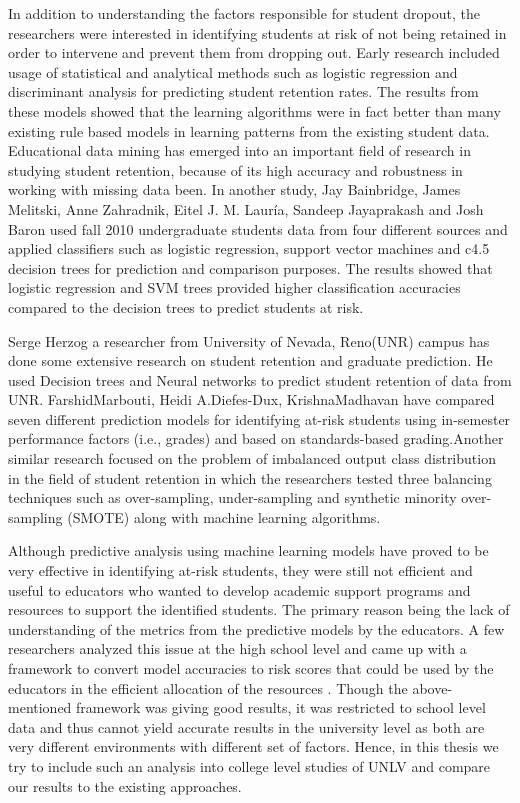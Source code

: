 \documentclass[11pt,openright]{report}
\begin{document}
In addition to understanding the factors responsible for student dropout, the researchers were interested in identifying students at risk of not being retained in order to intervene and prevent them from dropping out. Early research included usage of statistical and analytical methods such as logistic regression and discriminant analysis for predicting student retention rates\cite{lakkaraju2015machine,marbouti2016models,adejo2017}. The results from these models showed that the learning algorithms were in fact better than many existing rule based models in learning patterns from the existing student data. Educational data mining has emerged into an important field of research in studying student retention, because of its high accuracy and robustness in working with missing data been\cite{alkhasawneh2014developing}. In another study, Jay Bainbridge, James Melitski, Anne Zahradnik, Eitel J. M. Lauría, Sandeep Jayaprakash and Josh Baron used fall 2010 undergraduate students data from four different sources and applied classifiers such as logistic regression, support vector machines and c4.5 decision trees for prediction and comparison purposes\cite{bainbridge2015}. The results showed that logistic regression and SVM trees provided higher classification accuracies compared to the decision trees to predict students at risk. 

Serge Herzog a researcher from University of Nevada, Reno(UNR) campus has done some extensive research on student retention and graduate prediction. He used Decision trees and Neural networks to predict student retention of data from UNR\cite{herzog2006estimating}. FarshidMarbouti, Heidi A.Diefes-Dux, KrishnaMadhavan \cite{marbouti2016models} have compared seven different prediction models for identifying at-risk students using in-semester performance factors (i.e., grades) and based on standards-based grading.Another similar research focused on the problem of imbalanced output class distribution in the field of student retention in which the researchers tested three balancing techniques such as over-sampling, under-sampling and synthetic minority over-sampling (SMOTE) along with machine learning algorithms.

Although predictive analysis using machine learning models have proved to be very effective in identifying at-risk students, they were still not efficient and useful to educators who wanted to develop academic support programs and resources to support the identified students. The primary reason being the lack of understanding of the metrics from the predictive models by the educators. A few researchers analyzed this issue at the high school level and came up with a framework to convert model accuracies to risk scores that could be used by the educators in the efficient allocation of the resources \cite{lakkaraju2015machine}. Though the above-mentioned framework was giving good results, it was restricted to school level data and thus cannot yield accurate results in the university level as both are very different environments with different set of factors. Hence, in this thesis we try to include such an analysis into college level studies of UNLV and compare our results to the existing approaches.
\end{document}
